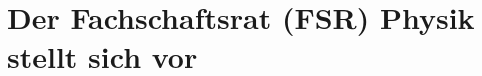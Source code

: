 
\newcommand{\fibelvorstellung}[2]{
\vspace{1cm}
\begin{minipage}{\columnwidth}
\setlength{\intextsep}{0cm}
\setlength{\parskip}{0.15cm}
#1
#2
\end{minipage}

}

\section{Der Fachschaftsrat (FSR) Physik stellt sich vor}
